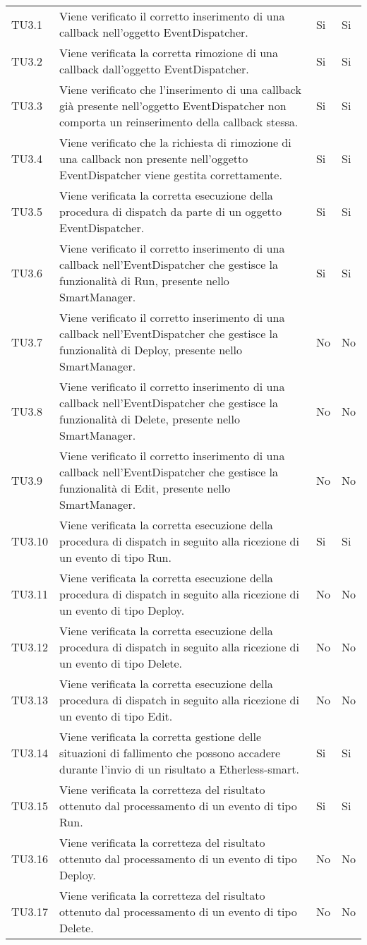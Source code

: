 \begin{longtable}{
		>{\centering}p{}
		>{}p{}
		>{\centering}p{}
		>{\centering}p{} }
	TU3.1 & Viene verificato il corretto inserimento di una callback nell'oggetto EventDispatcher.  & Si & Si \tabularnewline
	TU3.2 & Viene verificata la corretta rimozione di una callback dall'oggetto EventDispatcher.  & Si & Si \tabularnewline
	TU3.3 & Viene verificato che l'inserimento di una callback già presente nell'oggetto EventDispatcher non comporta un reinserimento della callback stessa.& Si & Si \tabularnewline
	TU3.4 & Viene verificato che la richiesta di rimozione di una callback non presente nell'oggetto EventDispatcher viene gestita correttamente. & Si & Si \tabularnewline
	TU3.5 & Viene verificata la corretta esecuzione della procedura di dispatch da parte di un oggetto EventDispatcher.  & Si & Si \tabularnewline
	TU3.6 & Viene verificato il corretto inserimento di una callback nell'EventDispatcher che gestisce la funzionalità di Run, presente nello SmartManager. & Si & Si \tabularnewline
	TU3.7 & Viene verificato il corretto inserimento di una callback nell'EventDispatcher che gestisce la funzionalità di Deploy, presente nello SmartManager. & No & No \tabularnewline
	TU3.8 & Viene verificato il corretto inserimento di una callback nell'EventDispatcher che gestisce la funzionalità di Delete, presente nello SmartManager. & No & No \tabularnewline
	TU3.9 & Viene verificato il corretto inserimento di una callback nell'EventDispatcher che gestisce la funzionalità di Edit, presente nello SmartManager. & No & No \tabularnewline
	TU3.10 & Viene verificata la corretta esecuzione della procedura di dispatch in seguito alla ricezione di un evento di tipo Run. & Si & Si \tabularnewline
	TU3.11 & Viene verificata la corretta esecuzione della procedura di dispatch in seguito alla ricezione di un evento di tipo Deploy. & No & No \tabularnewline
	TU3.12 & Viene verificata la corretta esecuzione della procedura di dispatch in seguito alla ricezione di un evento di tipo Delete. & No & No \tabularnewline
	TU3.13 & Viene verificata la corretta esecuzione della procedura di dispatch in seguito alla ricezione di un evento di tipo Edit. & No & No \tabularnewline
	TU3.14 & Viene verificata la corretta gestione delle situazioni di fallimento che possono accadere durante l'invio di un risultato a Etherless-smart.  & Si & Si \tabularnewline
	TU3.15 & Viene verificata la corretteza del risultato ottenuto dal processamento di un evento di tipo Run. & Si & Si \tabularnewline
	TU3.16 & Viene verificata la corretteza del risultato ottenuto dal processamento di un evento di tipo Deploy. & No & No \tabularnewline
	TU3.17 & Viene verificata la corretteza del risultato ottenuto dal processamento di un evento di tipo Delete. & No & No \tabularnewline

\end{longtable}
